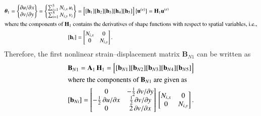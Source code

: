 \small
\begin{subequations}
	\begin{align}
	\boldsymbol{\theta}_1 =  \begin{Bmatrix}
		\partial u / \partial x\\
		\partial v / \partial y
	\end{Bmatrix}
	= \begin{Bmatrix}
		\sum\nolimits_{i=1}^5 N_{i,x} \, u_i\\
		\sum\nolimits_{i=1}^5 N_{i,y} \, v_i
	\end{Bmatrix} 
	& = \begin{bmatrix}
		[\mathbf{h}_1] [\mathbf{h}_2] [\mathbf{h}_3] [\mathbf{h}_4] [\mathbf{h}_5] 
	\end{bmatrix} \bigl\{ \begin{matrix} \mathbf{u}^{(e)} \end{matrix} \bigr\} 
	= \mathbf{H}_1  \mathbf{u}^{(e)} \\
		\intertext{where the components of $\mathbf{H}_1$ contains the derivatives of shape functions with respect to spatial variables, i.e.,}
		[\mathbf{h}_i] & = \begin{bmatrix}
			N_{i,x} &  0  \\
			0 & N_{i,y}  \end{bmatrix} .
	\end{align}
\end{subequations}
\normalsize 
Therefore, the first nonlinear strain--displacement matrix $\mathbf{B}_{N1}$ can be written as
\begin{subequations}
	\begin{align}
	\mathbf{B}_{N1} = \mathbf{A}_1 \, \mathbf{H}_1 = \begin{bmatrix}
		[\mathbf{b}_{N1}] [\mathbf{b}_{N2}] [\mathbf{b}_{N3}] [\mathbf{b}_{N4}] [\mathbf{b}_{N5}] 
	\end{bmatrix}  \\
		\intertext{where the components of $\mathbf{B}_{N1}$ are given as}
		[\mathbf{b}_{Ni}] = \begin{bmatrix}
			0 &  - \tfrac{1}{2} \, \partial v / \partial y \\
			-\tfrac{1}{2} \, \partial u / \partial x &  \tfrac{1}{2} \, \partial v / \partial y \\
			0  & 2 \, \partial v / \partial x  \end{bmatrix}  \, \begin{bmatrix}
			N_{i,x} &  0  \\
			0 & N_{i,y}  \end{bmatrix}.
	\end{align}
\end{subequations}


